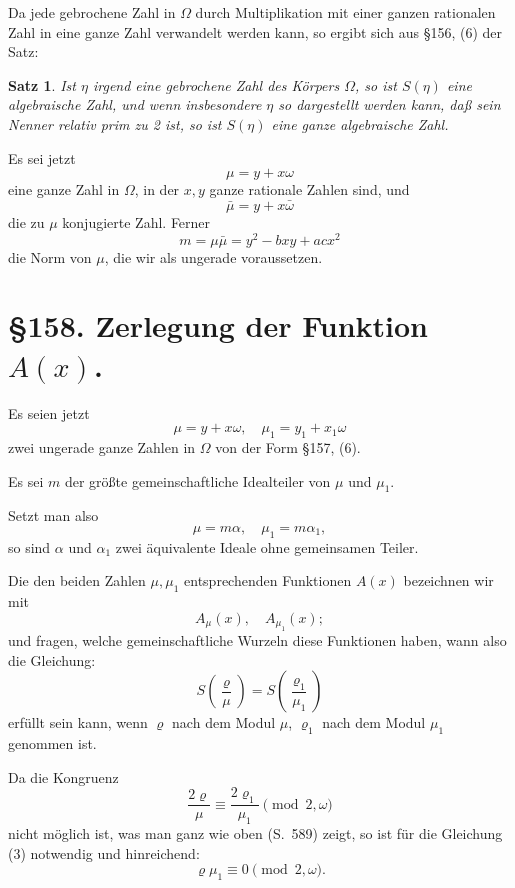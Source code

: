 \documentclass[12pt,a4paper]{article}
\newtheorem*{satz}{Satz}
\begin{document}
Da jede gebrochene Zahl in $\Omega$ durch Multiplikation mit einer ganzen rationalen Zahl in eine ganze Zahl verwandelt werden kann, so ergibt sich aus \S 156, (6) der Satz:

\begin{satz}
Ist $\eta$ irgend eine gebrochene Zahl des K\"orpers $\Omega$, so ist $S(\eta)$ eine algebraische Zahl, und wenn insbesondere $\eta$ so dargestellt werden kann, da\ss{} sein Nenner relativ prim zu 2 ist, so ist $S(\eta)$ eine ganze algebraische Zahl.
\end{satz}

Es sei jetzt
\begin{equation}\mu = y + x\omega\end{equation}
eine ganze Zahl in $\Omega$, in der $x, y$ ganze rationale Zahlen sind, und
\[\bar{\mu} = y + x\bar{\omega}\]
die zu $\mu$ konjugierte Zahl. Ferner
\begin{equation}m = \mu\bar{\mu} = y^2 - bxy + acx^2\end{equation}
die Norm von $\mu$, die wir als ungerade voraussetzen.

\section*{\S 158. Zerlegung der Funktion $A(x)$.}

Es seien jetzt
\begin{equation}\mu = y + x\omega, \quad \mu_1 = y_1 + x_1\omega\end{equation}
zwei ungerade ganze Zahlen in $\Omega$ von der Form \S 157, (6).

Es sei $m$ der gr\"o\ss{}te gemeinschaftliche Idealteiler von $\mu$ und $\mu_1$.

Setzt man also
\[\mu = m\alpha, \quad \mu_1 = m\alpha_1,\]
so sind $\alpha$ und $\alpha_1$ zwei \"aquivalente Ideale ohne gemeinsamen Teiler.

Die den beiden Zahlen $\mu, \mu_1$ entsprechenden Funktionen $A(x)$ bezeichnen wir mit
\[A_\mu(x), \quad A_{\mu_1}(x);\]
und fragen, welche gemeinschaftliche Wurzeln diese Funktionen haben, wann also die Gleichung:
\begin{equation}S\left(\frac{\varrho}{\mu}\right) = S\left(\frac{\varrho_1}{\mu_1}\right)\end{equation}
erf\"ullt sein kann, wenn $\varrho$ nach dem Modul $\mu$, $\varrho_1$ nach dem Modul $\mu_1$ genommen ist.

Da die Kongruenz
\[\frac{2\varrho}{\mu} \equiv \frac{2\varrho_1}{\mu_1} \pmod{2, \omega}\]
nicht m\"oglich ist, was man ganz wie oben (S.~589) zeigt, so ist f\"ur die Gleichung (3) notwendig und hinreichend:
\begin{equation}\varrho\mu_1 \equiv 0 \pmod{2, \omega}.\end{equation}
\end{document}
